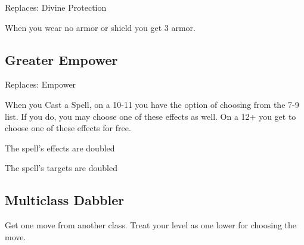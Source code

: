 Replaces: Divine Protection

 

When you wear no armor or shield you get 3 armor.

 
\subsection{Greater Empower}    
 

Replaces: Empower

 

When you Cast a Spell, on a 10-11 you have the option of choosing from the 7-9 list. If you do, you may choose one of these effects as well. On a 12+ you get to choose one of these effects for free.

 
\startitemize[1,packed]

\item The spell’s effects are doubled

 
\item The spell’s targets are doubled


\stopitemize
 
\subsection{Multiclass Dabbler}    
 

Get one move from another class. Treat your level as one lower for choosing the move.










